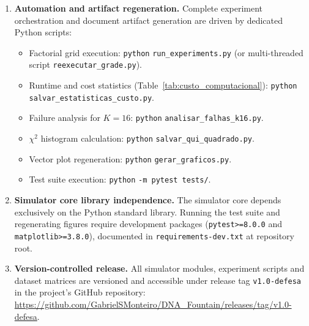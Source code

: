 \begin{enumerate}
    \item \textbf{Automation and artifact regeneration.} Complete experiment orchestration and document artifact generation are driven by dedicated Python scripts:
    \begin{itemize}
        \item Factorial grid execution: \texttt{python} \texttt{run\_experiments.py} (or multi-threaded script \texttt{reexecutar\_grade.py}).
        \item Runtime and cost statistics (Table~\ref{tab:custo_computacional}): \texttt{python} \texttt{salvar\_estatisticas\_custo.py}.
        \item Failure analysis for $K=16$: \texttt{python} \texttt{analisar\_falhas\_k16.py}.
        \item $\chi^2$ histogram calculation: \texttt{python} \texttt{salvar\_qui\_quadrado.py}.
        \item Vector plot regeneration: \texttt{python} \texttt{gerar\_graficos.py}.
        \item Test suite execution: \texttt{python} \texttt{-m pytest tests/}.
    \end{itemize}

    \item \textbf{Simulator core library independence.} The simulator core depends exclusively on the Python standard library. Running the test suite and regenerating figures require development packages (\texttt{pytest>=8.0.0} and \texttt{matplotlib>=3.8.0}), documented in \texttt{requirements-dev.txt} at repository root.
    
    \item \textbf{Version-controlled release.} All simulator modules, experiment scripts and dataset matrices are versioned and accessible under release tag \texttt{v1.0-defesa} in the project's GitHub repository: \url{https://github.com/GabrielSMonteiro/DNA_Fountain/releases/tag/v1.0-defesa}.
\end{enumerate}
